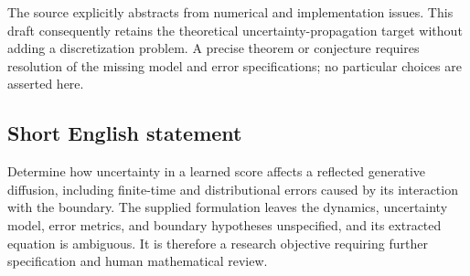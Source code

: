 \documentclass[11pt]{article}
\begin{document}
The source explicitly abstracts from numerical and implementation issues. This draft consequently retains the theoretical uncertainty-propagation target without adding a discretization problem. A precise theorem or conjecture requires resolution of the missing model and error specifications; no particular choices are asserted here.
\subsection{Short English statement}
Determine how uncertainty in a learned score affects a reflected generative diffusion, including finite-time and distributional errors caused by its interaction with the boundary. The supplied formulation leaves the dynamics, uncertainty model, error metrics, and boundary hypotheses unspecified, and its extracted equation is ambiguous. It is therefore a research objective requiring further specification and human mathematical review.
\end{document}
